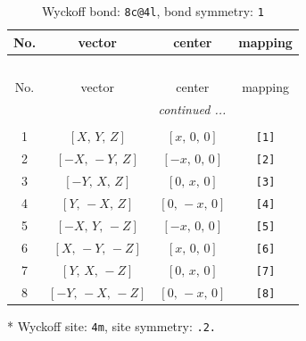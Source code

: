 \documentclass[fleqn,8pt]{jsarticle}
\begin{document}
\renewcommand{\arraystretch}{1.2}
\begin{longtable}{cccc}
\caption{Wyckoff bond: {\tt 8c@4l}, bond symmetry: {\tt 1}}
 \\
 \hline \hline
No. & vector & center & mapping \\ \hline \endfirsthead

\multicolumn{3}{l}{\tablename\ \thetable{}} \\
 \hline \hline
No. & vector & center & mapping \\ \hline \endhead

 \hline \hline
\multicolumn{3}{r}{\footnotesize\it continued ...} \\ \endfoot

 \hline \hline
\multicolumn{3}{r}{} \\ \endlastfoot

1 & $\left[ X,\, Y,\, Z \right]$ & $\left[ x,\, 0,\, 0 \right]$ & {\tt [1]} \\ \hline
2 & $\left[ - X,\, - Y,\, Z \right]$ & $\left[ - x,\, 0,\, 0 \right]$ & {\tt [2]} \\ \hline
3 & $\left[ - Y,\, X,\, Z \right]$ & $\left[ 0,\, x,\, 0 \right]$ & {\tt [3]} \\ \hline
4 & $\left[ Y,\, - X,\, Z \right]$ & $\left[ 0,\, - x,\, 0 \right]$ & {\tt [4]} \\ \hline
5 & $\left[ - X,\, Y,\, - Z \right]$ & $\left[ - x,\, 0,\, 0 \right]$ & {\tt [5]} \\ \hline
6 & $\left[ X,\, - Y,\, - Z \right]$ & $\left[ x,\, 0,\, 0 \right]$ & {\tt [6]} \\ \hline
7 & $\left[ Y,\, X,\, - Z \right]$ & $\left[ 0,\, x,\, 0 \right]$ & {\tt [7]} \\ \hline
8 & $\left[ - Y,\, - X,\, - Z \right]$ & $\left[ 0,\, - x,\, 0 \right]$ & {\tt [8]} \\
\end{longtable}
* Wyckoff site: {\tt 4m}, site symmetry: {\tt .2.}
\renewcommand{\arraystretch}{1.2}
\end{document}
